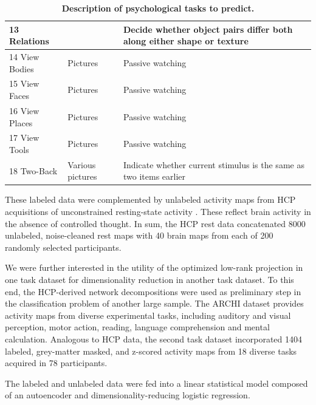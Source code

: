\documentclass{article} %
\begin{document}
\begin{table}[h]
{\begin{tabular}{l|l|l}
  13 Relations         &                                       & Decide whether object pairs differ both along either shape or texture             \\ \hline
  14 View Bodies       & Pictures                              & Passive watching                                                                   \\ \hline
  15 View Faces        & Pictures                              & Passive watching                                                                   \\ \hline
  16 View Places       & Pictures                              & Passive watching                                                                   \\ \hline
  17 View Tools        & Pictures                              & Passive watching                                                                   \\ \hline
  18 Two-Back          & Various pictures                      & Indicate whether current stimulus is the same as two items earlier                \\ \hline
  \end{tabular}
}
\vspace{-0.2cm}
\caption{\textbf{Description of psychological tasks to predict.}}
\label{table_tasks}
\end{table}

These labeled data were complemented by unlabeled activity maps
from HCP acquisitions of unconstrained resting-state activity
\cite{smith2013resting}.
These reflect brain activity in the absence of controlled thought.
In sum, the HCP rest data concatenated
8000 unlabeled, noise-cleaned rest maps with
40 brain maps from each of 200 randomly selected participants.

We were further interested in the utility of the
optimized low-rank projection
in one task dataset for dimensionality reduction in another task dataset.
To this end, the HCP-derived network decompositions were used as preliminary
step in the classification problem of another large sample.
The ARCHI dataset \cite{pinel07} provides activity maps from
diverse experimental tasks, including auditory and visual perception, motor action,
reading, language comprehension and mental calculation.
Analogous to HCP data, the second task dataset incorporated 1404
labeled, grey-matter masked, and z-scored activity maps
from 18 diverse tasks acquired in 78 participants.

The labeled and unlabeled data were fed into a linear statistical model
composed of an autoencoder and dimensionality-reducing logistic regression.
\end{document}
